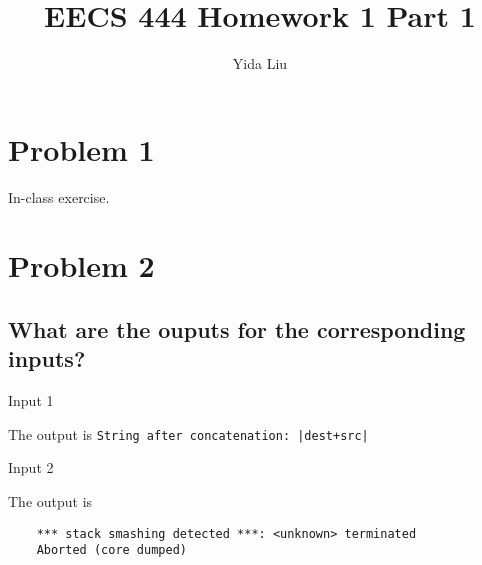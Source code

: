\documentclass[11pt]{article}
\begin{document}
\author{Yida Liu}
\title{EECS 444 Homework 1 Part 1}
\maketitle

\section{Problem 1}

In-class exercise.

\section{Problem 2}

\subsection{What are the ouputs for the corresponding inputs?}
\begin{description}
    \item Input 1\par
    The output is \lstinline{String after concatenation: |dest+src|}
    \item Input 2\par
    The output is \begin{lstlisting}
    *** stack smashing detected ***: <unknown> terminated
    Aborted (core dumped)
    \end{lstlisting}
\end{description}
\end{document}
